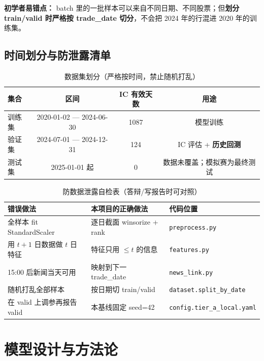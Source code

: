 \documentclass[UTF8,a4paper,12pt]{ctexart}
\begin{document}
\textbf{初学者易错点：} batch 里的一批样本可以来自不同日期、不同股票；但\textbf{划分 train/valid 时严格按 trade\_date 切分}，不会把 2024 年的行混进 2020 年的训练集。

\subsection{时间划分与防泄露清单}

\begin{table}[H]
\centering
\caption{数据集划分（严格按时间，禁止随机打乱）}
\label{tab:split}
\begin{tabular}{lccc}
\toprule
\textbf{集合} & \textbf{区间} & \textbf{IC 有效天数} & \textbf{用途} \\
\midrule
训练集 & 2020-01-02 --- 2024-06-30 & 1087 & 模型训练 \\
验证集 & 2024-07-01 --- 2024-12-31 & 124  & IC 评估 + \textbf{历史回测} \\
测试集 & 2025-01-01 起             & 0    & 数据未覆盖；模拟赛为最终测试 \\
\bottomrule
\end{tabular}
\end{table}

\begin{table}[H]
\centering
\caption{防数据泄露自检表（答辩/写报告时可对照）}
\label{tab:leak-check}
\small
\begin{tabular}{p{4.2cm}p{4.2cm}p{4.5cm}}
\toprule
\textbf{错误做法} & \textbf{本项目的正确做法} & \textbf{代码位置} \\
\midrule
全样本 fit StandardScaler & 逐日截面 winsorize + rank & \texttt{preprocess.py} \\
用 $t\!+\!1$ 日数据做 $t$ 日特征 & 特征只用 $\le t$ 的信息 & \texttt{features.py} \\
15:00 后新闻当天可用 & 映射到下一 trade\_date & \texttt{news\_link.py} \\
随机打乱全部样本 & 按日期切 train/valid & \texttt{dataset.split\_by\_date} \\
在 valid 上调参再报告 valid & 本基线固定 seed=42 & \texttt{config.tier\_a\_local.yaml} \\
\bottomrule
\end{tabular}
\end{table}

\section{模型设计与方法论}
\end{document}
